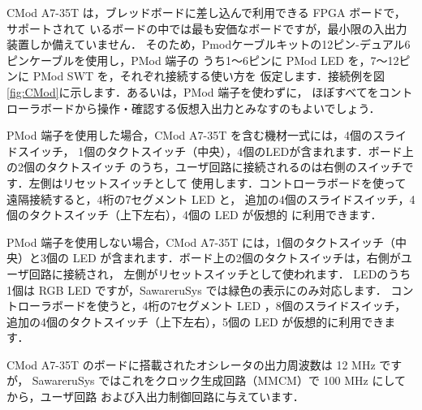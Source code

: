 CMod A7-35T は，ブレッドボードに差し込んで利用できる FPGA ボードで，サポートされて
いるボードの中では最も安価なボードですが，最小限の入出力装置しか備えていません．
そのため，Pmodケーブルキットの12ピン-デュアル6ピンケーブルを使用し，PMod 端子の
うち1～6ピンに PMod LED を，7～12ピンに PMod SWT を，それぞれ接続する使い方を
仮定します．接続例を図\ref{fig:CMod}に示します．あるいは，PMod 端子を使わずに，
ほぼすべてをコントローラボードから操作・確認する仮想入出力とみなすのもよいでしょう．

PMod 端子を使用した場合，CMod A7-35T を含む機材一式には，4個のスライドスイッチ，
1個のタクトスイッチ（中央），4個のLEDが含まれます．ボード上の2個のタクトスイッチ
のうち，ユーザ回路に接続されるのは右側のスイッチです．左側はリセットスイッチとして
使用します．コントローラボードを使って遠隔接続すると，4桁の7セグメント LED と，
追加の4個のスライドスイッチ，4個のタクトスイッチ（上下左右），4個の LED が仮想的
に利用できます．

PMod 端子を使用しない場合，CMod A7-35T には，1個のタクトスイッチ（中央）と3個の
LED が含まれます．ボード上の2個のタクトスイッチは，右側がユーザ回路に接続され，
左側がリセットスイッチとして使われます．
LEDのうち1個は RGB LED ですが，SawareruSys では緑色の表示にのみ対応します．
コントローラボードを使うと，4桁の7セグメント LED ，8個のスライドスイッチ，
追加の4個のタクトスイッチ（上下左右），5個の LED が仮想的に利用できます．

CMod A7-35T のボードに搭載されたオシレータの出力周波数は 12 MHz ですが，
SawareruSys ではこれをクロック生成回路（MMCM）で 100 MHz にしてから，ユーザ回路
および入出力制御回路に与えています．

